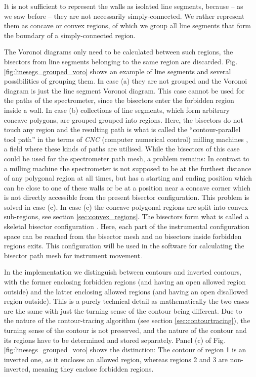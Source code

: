 It is not sufficient to represent the walls as isolated line segments, because -- 
as we saw before -- they are not necessarily simply-connected. 
We rather represent them as concave or convex regions, of which we group all 
line segments that form the boundary of a simply-connected region.

The Voronoi diagrams only need to be calculated between such regions, 
the bisectors from line segments belonging to the same region are discarded. 
Fig. \ref{fig:linesegs_grouped_voro} shows an example of line segments and several
possibilities of grouping them. 
In case (a) they are not grouped and the Voronoi diagram is just the line 
segment Voronoi diagram. This case cannot be used for the paths of the spectrometer,
since the bisectors enter the forbidden region inside a wall.
In case (b) collections of line segments, which form arbitrary concave polygons, 
are grouped grouped into regions. Here, the bisectors do not touch any region 
and the resulting path is what is called the ``contour-parallel tool path'' in 
the terms of \textit{CNC} (computer numerical control) milling machines \cite{Jeong1998, wiki_milling}, 
a field where these kinds of paths are utilised. While the bisectors of this case could 
be used for the spectrometer path mesh, a problem remains: In contrast to a milling
machine the spectrometer is not supposed to be at the furthest distance of any
polygonal region at all times, but has a starting and ending position which can 
be close to one of these walls or be at a position near a concave corner which
is not directly accessible from the present bisector configuration. This problem
is solved in case (c).
In case (c) the concave polygonal regions are split into convex sub-regions, see
section \ref{sec:convex_regions}.
The bisectors form what is called a skeletal bisector configuration \cite{Jeong1998, Couprie2007}.
Here, each part of the instrumental configuration space can be reached from the
bisector mesh and no bisectors inside forbidden regions exits. This configuration
will be used in the software for calculating the bisector path mesh for instrument
movement.

In the implementation we distinguish between contours and inverted contours, with 
the former enclosing forbidden regions (and having an open allowed region outside) 
and the latter enclosing allowed regions (and having an open disallowed region outside).
This is a purely technical detail as mathematically the two cases are the same
with just the turning sense of the contour being different. 
Due to the nature of the contour-tracing algorithm (see section \ref{sec:contourtracing}), 
the turning sense of the contour is not preserved, and the nature of the contour 
and its regions have to be determined and stored separately.
Panel (c) of Fig. \ref{fig:linesegs_grouped_voro} shows the distinction: 
The contour of region 1 is an inverted one, as it encloses an allowed region,
whereas regions 2 and 3 are non-inverted, meaning they enclose forbidden regions.

